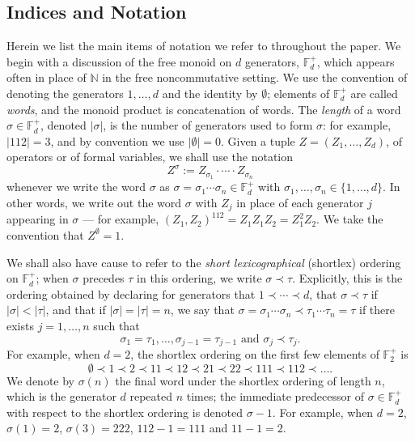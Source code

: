 \documentclass[11pt,reqno]{amsart}
\def\s{\sigma}
\def\t{\tau}
\def\NN{\mathbb{N}}
\def\FF{\mathbb{F}}
\theoremstyle{definition}
\numberwithin{equation}{section}
\begin{document}
\subsection{Indices and Notation}

Herein we list the main items of notation we refer to throughout the paper. We begin with a discussion of the free monoid on \(d\) generators, \(\FF_d^+\), which appears often in place of \(\NN\) in the free noncommutative setting. We use the convention of denoting the generators \(1, \ldots, d\) and the identity by \(\emptyset\); elements of \(\FF_d^+\) are called \emph{words}, and the monoid product is concatenation of words. The \emph{length} of a word \(\s \in \FF_d^+\), denoted \(\lvert \s \rvert\), is the number of generators used to form \(\s\): for example, \(\lvert 112\rvert = 3\), and by convention we use \(\lvert \emptyset \rvert = 0\). Given a tuple \(Z = (Z_1, \ldots, Z_d)\), of operators or of formal variables, we shall use the notation
\[
    Z^\s := Z_{\s_1} \cdot \cdots \cdot Z_{\s_n}
\]
whenever we write the word \(\s\) as \(\s = \s_1 \cdots \s_n \in \FF_d^+\) with \(\s_1, \ldots, \s_n \in \{1, \ldots, d\}\). In other words, we write out the word \(\s\) with \(Z_j\) in place of each generator \(j\) appearing in \(\s\) --- for example, \((Z_1, Z_2)^{112} = Z_1 Z_1 Z_2 = Z_1^2 Z_2\). We take the convention that \(Z^{\emptyset} = 1\).

We shall also have cause to refer to the \emph{short lexicographical} (shortlex) ordering on \(\FF_d^+\); when \(\s\) precedes \(\t\) in this ordering, we write \(\s \prec \t\). Explicitly, this is the ordering obtained by declaring for generators that \(1 \prec \cdots \prec d\), that \(\s \prec \t\) if \(\lvert \s \rvert < \lvert \t \rvert\), and that if \(\lvert \s \rvert = \lvert \t \rvert = n\), we say that \(\s = \s_1\cdots\s_n \prec \t_1\cdots\t_n = \t\) if there exists \(j = 1, \ldots, n\) such that
\[
    \s_1 = \t_1, \ldots, \s_{j-1} = \t_{j-1} \text{ and } \s_j \prec \t_j.
\]
For example, when \(d = 2\), the shortlex ordering on the first few elements of \(\FF_2^+\) is
\[
    \emptyset \prec 1 \prec 2 \prec 11 \prec 12 \prec 21 \prec 22 \prec 111 \prec 112 \prec \ldots.
\]
We denote by \(\s(n)\) the final word under the shortlex ordering of length \(n\), which is the generator \(d\) repeated \(n\) times; the immediate predecessor of \(\s \in \FF_d^+\) with respect to the shortlex ordering is denoted \(\s - 1\). For example, when \(d=2\), \(\s(1) = 2\), \(\s(3) = 222\), \(112 - 1 = 111\) and \(11 - 1 = 2\).
\end{document}
